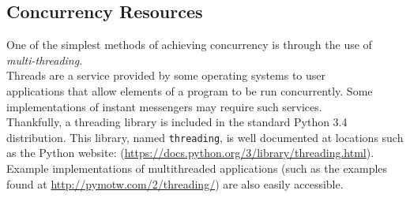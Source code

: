 \documentclass[a4paper, 12pt]{article}
\begin{document}
\pagebreak

\subsection{Concurrency Resources}
One of the simplest methods of achieving concurrency is through the use of 
\emph{multi-threading}.\\
Threads are a service provided by some operating systems to user\\ applications
that allow elements of a program to be run concurrently. Some\\ implementations
of instant messengers may require such services.\\[0.5\baselineskip]
Thankfully, a threading library is included in the standard Python 3.4\\
distribution. This library, named \texttt{threading}, is well documented at 
locations such as the Python website: 
(\href{https://docs.python.org/3/library/threading.html}
{https://docs.python.org/3/library/threading.html}). Example implementations of
multithreaded applications (such as the examples found at 
\href{http://pymotw.com/2/threading}{http://pymotw.com/2/threading/}) are also 
easily accessible.
\end{document}
